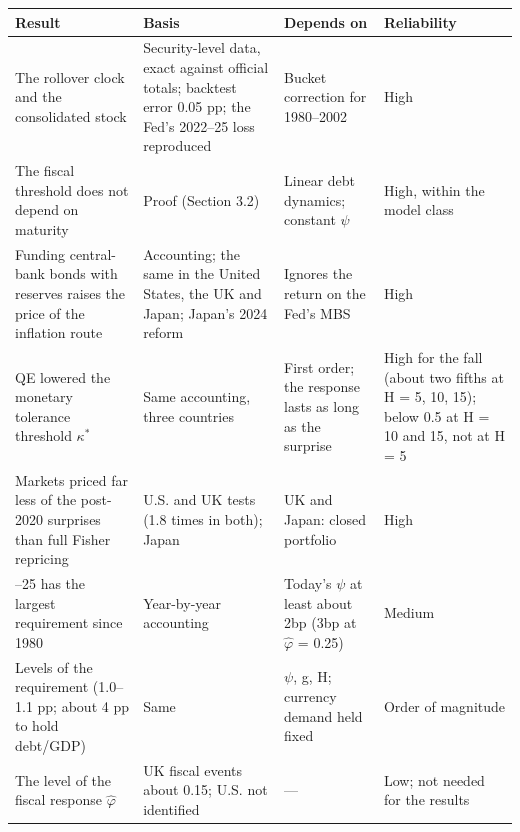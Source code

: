 \begin{center}
\footnotesize
\begin{tabularx}{\textwidth}{>{\raggedright\arraybackslash}X>{\raggedright\arraybackslash}X>{\raggedright\arraybackslash}X>{\raggedright\arraybackslash}X}
\toprule
Result & Basis & Depends on & Reliability \\
\midrule
The rollover clock and the consolidated stock & Security-level data, exact against official totals; backtest error 0.05 pp; the Fed's 2022–25 loss reproduced & Bucket correction for 1980–2002 & High \\
The fiscal threshold does not depend on maturity & Proof (Section 3.2) & Linear debt dynamics; constant $\psi$ & High, within the model class \\
Funding central-bank bonds with reserves raises the price of the inflation route & Accounting; the same in the United States, the UK and Japan; Japan's 2024 reform & Ignores the return on the Fed's MBS & High \\
QE lowered the monetary tolerance threshold $\kappa^*$ & Same accounting, three countries & First order; the response lasts as long as the surprise & High for the fall (about two fifths at H = 5, 10, 15); below 0.5 at H = 10 and 15, not at H = 5 \\
Markets priced far less of the post-2020 surprises than full Fisher repricing & U.S. and UK tests (1.8 times in both); Japan & UK and Japan: closed portfolio & High \\
2023–25 has the largest requirement since 1980 & Year-by-year accounting & Today's $\psi$ at least about 2bp (3bp at $\hat\varphi$ = 0.25) & Medium \\
Levels of the requirement (1.0–1.1 pp; about 4 pp to hold debt/GDP) & Same & $\psi$, g, H; currency demand held fixed & Order of magnitude \\
The level of the fiscal response $\hat\varphi$ & UK fiscal events about 0.15; U.S. not identified & — & Low; not needed for the results \\
\bottomrule
\end{tabularx}
\end{center}
